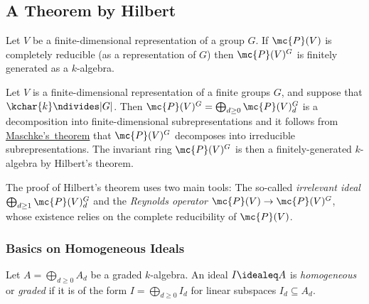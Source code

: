 \subsection{A Theorem by Hilbert}


\begin{theorem}[Hilbert]
  Let $V$ be a finite-dimensional representation of a group $G$.
  If $\mc{P}(V)$ is completely reducible (as a representation of $G$) then $\mc{P}(V)^G$ is finitely generated as a $k$-algebra.
\end{theorem}


\begin{example}
  \label{example: invariant ring for finite groups finitely generated}
  Let $V$ is a finite-dimensional representation of a finite groups $G$, and suppose that $\kchar{k} \ndivides |G|$.
  Then $\mc{P}(V)^G = \bigoplus_{d \geq 0} \mc{P}(V)^G_d$ is a decomposition into finite-dimensional subrepresentations and it follows from \hyperref[theorem: Maschkes theorem]{Maschke’s~theorem} that $\mc{P}(V)^G$ decomposes into irreducible subrepresentations.
  The invariant ring $\mc{P}(V)^G$ is then a finitely-generated $k$-algebra by Hilbert’s theorem.
\end{example}


\begin{fluff}
  The proof of Hilbert's theorem uses two main tools:
  The so-called \emph{irrelevant ideal} $\bigoplus_{d \geq 1} \mc{P}(V)^G_d$ and the \emph{Reynolds operator} $\mc{P}(V) \to \mc{P}(V)^G$, whose existence relies on the complete reducibility of $\mc{P}(V)$.
\end{fluff}



\subsubsection{Basics on Homogeneous Ideals}

\begin{definition}
  Let $A = \bigoplus_{d \geq 0} A_d$ be a graded $k$-algebra.
  An ideal $I \idealeq A$ is \emph{homogeneous} or \emph{graded} if it is of the form $I = \bigoplus_{d \geq 0} I_d$ for linear subspaces $I_d \subseteq A_d$.
\end{definition}


